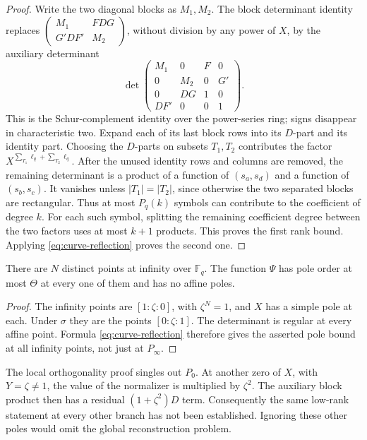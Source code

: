 \begin{proof}
Write the two diagonal blocks as $M_1,M_2$. The block determinant identity replaces
$\left(\begin{smallmatrix}M_1&FDG\\G'DF'&M_2\end{smallmatrix}\right)$,
without division by any power of $X$, by the auxiliary determinant
\[
 \det\begin{pmatrix}
 M_1&0&F&0\\
 0&M_2&0&G'\\
 0&DG&1&0\\
 DF'&0&0&1
 \end{pmatrix}.
\]
This is the Schur-complement identity over the power-series ring; signs disappear in characteristic two. Expand each of its last block rows into its $D$-part and its identity part. Choosing the $D$-parts on subsets $T_1,T_2$ contributes the factor
$X^{\sum_{T_1}\ell_q+\sum_{T_2}\ell_q}$.
After the unused identity rows and columns are removed, the remaining determinant is a product of a function of $(s_a,s_d)$ and a function of $(s_b,s_c)$. It vanishes unless $|T_1|=|T_2|$, since otherwise the two separated blocks are rectangular. Thus at most $P_q(k)$ symbols can contribute to the coefficient of degree $k$. For each such symbol, splitting the remaining coefficient degree between the two factors uses at most $k+1$ products. This proves the first rank bound. Applying \eqref{eq:curve-reflection} proves the second one.
\end{proof}

\begin{corollary}\label{cor:curve-poles}
There are $N$ distinct points at infinity over $\mathbb F_q$. The function $\Psi$ has pole order at most $\Theta$ at every one of them and has no affine poles.
\end{corollary}
\begin{proof}
The infinity points are $[1:\zeta:0]$, with $\zeta^N=1$, and $X$ has a simple pole at each. Under $\sigma$ they are the points $[0:\zeta:1]$. The determinant is regular at every affine point. Formula \eqref{eq:curve-reflection} therefore gives the asserted pole bound at all infinity points, not just at $P_\infty$.
\end{proof}

The local orthogonality proof singles out $P_0$. At another zero of $X$, with $Y=\zeta\ne1$, the value of the normalizer is multiplied by $\zeta^2$. The auxiliary block product then has a residual $(1+\zeta^2)D$ term. Consequently the same low-rank statement at every other branch has not been established. Ignoring these other poles would omit the global reconstruction problem.


